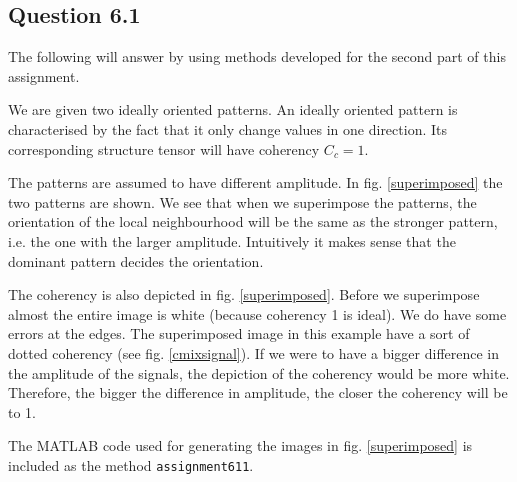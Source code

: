 \documentclass[a4paper, 10pt, final]{article}
\title{\mytitle}
\subtitle{\mysubtitle}
\author{\myauthor{} - \mymail}
\date{\mydate}
\begin{document}
\maketitle

\subsection*{Question 6.1}
The following will answer \citep[Excercise 13.5, p. 395]{jahne-digital}
by using methods developed for the second part of this assignment.

We are given two ideally oriented patterns. An ideally oriented pattern
is characterised by the fact that it only change values in one
direction. Its corresponding structure tensor will have coherency $C_c =
1$.

The patterns are assumed to have different amplitude. In fig.
\ref{superimposed} the two patterns are shown. We see that when we
superimpose the patterns, the orientation of the local neighbourhood
will be the same as the stronger pattern, i.e. the one with the larger
amplitude. Intuitively it makes sense that the dominant pattern decides
the orientation.

The coherency is also depicted in fig. \ref{superimposed}. Before we
superimpose almost the entire image is white (because coherency 1 is
ideal). We do have some errors at the edges. The superimposed image in
this example have a sort of dotted coherency (see fig.
\ref{cmixsignal}). If we were to have a bigger difference in the
amplitude of the signals, the depiction of the coherency would be more
white. Therefore, the bigger the difference in amplitude, the closer the
coherency will be to 1.

The MATLAB code used for generating the images in fig.
\ref{superimposed} is included as the method \texttt{assignment611}.
\end{document}
